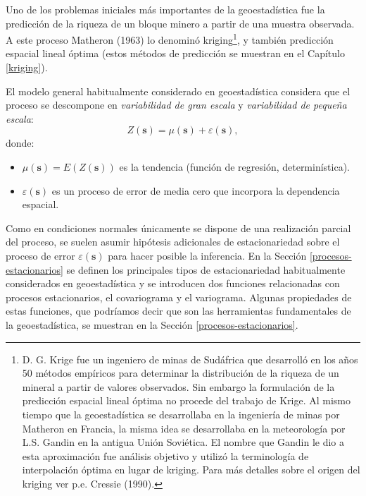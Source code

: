 \documentclass[
]{book}
\theoremstyle{break}
\theoremstyle{definition}
\theoremstyle{definition}
\theoremstyle{definition}
\theoremstyle{definition}
\theoremstyle{remark}
\begin{document}
Uno de los problemas iniciales más importantes de la geoestadística fue la predicción de la riqueza de un bloque minero a partir de una muestra observada.
A este proceso Matheron (1963) lo denominó kriging\footnote{D. G. Krige fue un ingeniero de minas de Sudáfrica que desarrolló
  en los años 50 métodos empíricos para determinar la distribución de
  la riqueza de un mineral a partir de valores observados.
  Sin embargo la formulación de la predicción espacial lineal óptima no
  procede del trabajo de Krige.
  Al mismo tiempo que la geoestadística se desarrollaba en la ingeniería
  de minas por Matheron en Francia, la misma idea se desarrollaba en la
  meteorología por L.S. Gandin en la antigua Unión Soviética.
  El nombre que Gandin le dio a esta aproximación fue análisis objetivo
  y utilizó la terminología de interpolación óptima en lugar de kriging.
  Para más detalles sobre el origen del kriging ver p.e. Cressie (1990).}, y también predicción espacial lineal óptima (estos métodos de predicción se muestran en el Capítulo \ref{kriging}).

El modelo general habitualmente considerado en geoestadística considera que el proceso se descompone en \emph{variabilidad de gran escala} y \emph{variabilidad de pequeña escala}:
\begin{equation}
  Z(\mathbf{s}) = \mu(\mathbf{s}) + \varepsilon(\mathbf{s}),
  \label{eq:modelogeneral}
\end{equation}
donde:

\begin{itemize}
\item
  \(\mu(\mathbf{s}) = E \left( Z(\mathbf{s}) \right)\) es la tendencia (función de regresión, determinística).
\item
  \(\varepsilon(\mathbf{s})\) es un proceso de error de media cero que incorpora la dependencia espacial.
\end{itemize}

Como en condiciones normales únicamente se dispone de una realización parcial del proceso, se suelen asumir hipótesis adicionales de estacionariedad sobre el proceso de error \(\varepsilon(\mathbf{s})\) para hacer posible la inferencia.
En la Sección \ref{procesos-estacionarios} se definen los principales tipos de estacionariedad habitualmente considerados en geoestadística y se introducen dos funciones relacionadas con procesos estacionarios, el covariograma y el variograma.
Algunas propiedades de estas funciones, que podríamos decir que son las herramientas fundamentales de la geoestadística, se muestran en la Sección \ref{procesos-estacionarios}.
\end{document}
